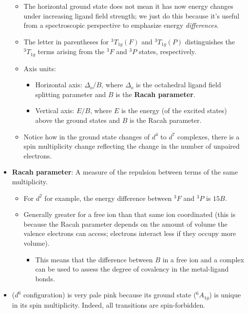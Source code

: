 \documentclass[../notes.tex]{subfiles}
\begin{document}
\begin{itemize}
\begin{itemize}
        \item The horizontal ground state does not mean it has now energy changes under increasing ligand field strength; we just do this because it's useful from a spectroscopic perspective to emphasize energy \emph{differences}.
        \item The letter in parentheses for ${}^3T_{1g}(F)$ and ${}^3T_{1g}(P)$ distinguishes the ${}^3T_{1g}$ terms arising from the ${}^3F$ and ${}^3P$ states, respectively.
        \item Axis units:
        \begin{itemize}
            \item Horizontal axis: $\Delta_o/B$, where $\Delta_o$ is the octahedral ligand field splitting parameter and $B$ is the \textbf{Racah parameter}.
            \item Vertical axis: $E/B$, where $E$ is the energy (of the excited states) above the ground states and $B$ is the Racah parameter.
        \end{itemize}
        \item Notice how in the ground state changes of $d^4$ to $d^7$ complexes, there is a spin multiplicity change reflecting the change in the number of unpaired electrons.
    \end{itemize}
    \item \textbf{Racah parameter}: A measure of the repulsion between terms of the same multiplicity.
    \begin{itemize}
        \item For $d^2$ for example, the energy difference between ${}^3F$ and ${}^3P$ is $15B$.
        \item Generally greater for a free ion than that same ion coordinated (this is because the Racah parameter depends on the amount of volume the valence electrons can access; electrons interact less if they occupy more volume).
        \begin{itemize}
            \item This means that the difference between $B$ in a free ion and a complex can be used to assess the degree of covalency in the metal-ligand bonds.
        \end{itemize}
    \end{itemize}
    \item {} ($d^6$ configuration) is very pale pink because its ground state (${}^6A_{1g}$) is unique in its spin multiplicity. Indeed, all transitions are spin-forbidden.
    \begin{itemize}

\end{itemize}
\end{itemize}
\end{document}
